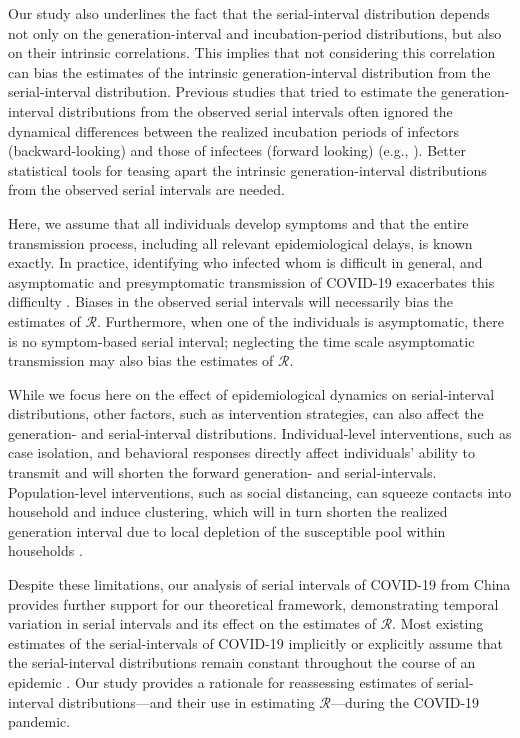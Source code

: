 \documentclass[12pt]{article}
\newcommand{\RR}{\ensuremath{{\mathcal R}}\xspace}
\begin{document}
Our study also underlines the fact that the serial-interval distribution depends not only on the generation-interval and incubation-period distributions, but also on their intrinsic correlations.
This implies that not considering this correlation can bias the estimates of the intrinsic generation-interval distribution from the serial-interval distribution.
Previous studies that tried to estimate the generation-interval distributions from the observed serial intervals often ignored the dynamical differences between the realized incubation periods of infectors (backward-looking) and those of infectees (forward looking) (e.g., \cite{klinkenberg2011correlation, ganyani2020estimating}).
Better statistical tools for teasing apart the intrinsic generation-interval distributions from the observed serial intervals are needed.

Here, we assume that all individuals develop symptoms and that the entire transmission process, including all relevant epidemiological delays, is known exactly.
In practice, identifying who infected whom is difficult in general, and asymptomatic and presymptomatic transmission of COVID-19 exacerbates this difficulty \citep{bai2020presumed,he2020temporal,wei2020presymptomatic}.
Biases in the observed serial intervals will necessarily bias the estimates of \RR. 
Furthermore, when one of the individuals is asymptomatic, there is no symptom-based serial interval; 
neglecting the time scale asymptomatic transmission may also bias the estimates of \RR \citep{park2020time}.

While we focus here on the effect of epidemiological dynamics on serial-interval distributions, other factors, such as intervention strategies, can also affect the generation- and serial-interval distributions.
Individual-level interventions, such as case isolation, and behavioral responses directly affect individuals' ability to transmit and will shorten the forward generation- and serial-intervals.
Population-level interventions, such as social distancing, can squeeze contacts into household and induce clustering, which will in turn shorten the realized generation interval due to local depletion of the susceptible pool within households \citep{park2020inferring}.

Despite these limitations, our analysis of serial intervals of COVID-19 from China provides further support for our theoretical framework, demonstrating temporal variation in serial intervals and its effect on the estimates of \RR.
Most existing estimates of the serial-intervals of COVID-19 implicitly or explicitly assume that the serial-interval distributions remain constant throughout the course of an epidemic \citep{du2020serial, he2020temporal, nishiura2020serial,tindale2020transmission,zhao2020estimating,zhang2020evolving}.
Our study provides a rationale for reassessing estimates of
serial-interval distributions---and their use in estimating
\RR---during the COVID-19 pandemic.
\end{document}
